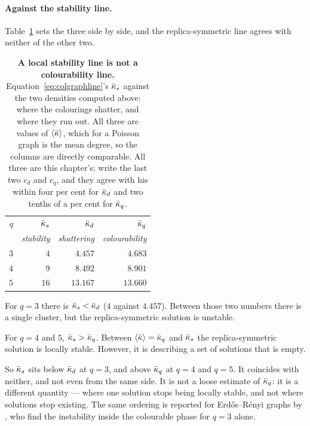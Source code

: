 \paragraph{Against the stability line.} Table~\ref{tab:colpublished} sets the
three side by side, and the replica-symmetric line agrees with neither of the
other two.
\begin{table}[t]
\centering\small
\begin{tabular}{rrrr}
\hline\hline
$q$ & $\bar\kappa_{s}$ & $\bar\kappa_{d}$ & $\bar\kappa_{q}$\\
 & \itshape stability & \itshape shattering & \itshape colourability\\
\hline
$3$ & $4$ & $4.457$ & $4.683$\\
$4$ & $9$ & $8.492$ & $8.901$\\
$5$ & $16$ & $13.167$ & $13.660$\\
\hline\hline
\end{tabular}
\caption{\textbf{A local stability line is not a colourability line.}
Equation~\eqref{eq:colgraphline}'s $\bar\kappa_{s}$ against the two densities
computed above: where the colourings shatter, and where they run out. All three
are values of $\langle \bar\kappa \rangle$, which for a Poisson graph is the mean degree, so
the columns are directly comparable. All three are this chapter's;
\citet{mulet2002} write the last two $c_{d}$ and $c_{q}$, and they agree with
his within four per cent for $\bar\kappa_{d}$ and two tenths of a per cent for
$\bar\kappa_{q}$.}
\label{tab:colpublished}
\end{table}

For $q=3$ there is $\bar\kappa_{s}<\bar\kappa_{d}$ ($4$ against $4.457$). Between those
two numbers there is a single cluster, but the replica-symmetric solution is
unstable.

For $q=4$ and $5$, $\bar\kappa_{s}>\bar\kappa_{q}$. Between
$\langle \bar\kappa \rangle=\bar\kappa_{q}$ and $\bar\kappa_{s}$ the replica-symmetric solution is
locally stable. However, it is describing a set of solutions that is empty.

So $\bar\kappa_{s}$ sits below $\bar\kappa_{d}$ at $q=3$, and above $\bar\kappa_{q}$ at
$q=4$ and $q=5$. It coincides with neither, and not even from the same
side. It is not a loose estimate of $\bar\kappa_{q}$: it is a different quantity ---
where one solution stops being locally stable, and not where solutions stop
existing. The same ordering is reported for Erd\H{o}s--R\'enyi graphs by
\citet{zdeborova2007}, who find the instability inside the colourable phase for
$q=3$ alone.


